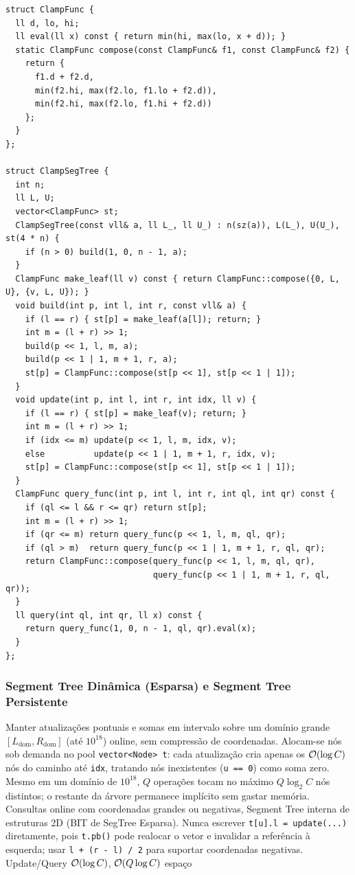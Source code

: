 \begin{lstlisting}
struct ClampFunc {
  ll d, lo, hi;
  ll eval(ll x) const { return min(hi, max(lo, x + d)); }
  static ClampFunc compose(const ClampFunc& f1, const ClampFunc& f2) {
    return {
      f1.d + f2.d,
      min(f2.hi, max(f2.lo, f1.lo + f2.d)),
      min(f2.hi, max(f2.lo, f1.hi + f2.d))
    };
  }
};

struct ClampSegTree {
  int n;
  ll L, U;
  vector<ClampFunc> st;
  ClampSegTree(const vll& a, ll L_, ll U_) : n(sz(a)), L(L_), U(U_), st(4 * n) {
    if (n > 0) build(1, 0, n - 1, a);
  }
  ClampFunc make_leaf(ll v) const { return ClampFunc::compose({0, L, U}, {v, L, U}); }
  void build(int p, int l, int r, const vll& a) {
    if (l == r) { st[p] = make_leaf(a[l]); return; }
    int m = (l + r) >> 1;
    build(p << 1, l, m, a);
    build(p << 1 | 1, m + 1, r, a);
    st[p] = ClampFunc::compose(st[p << 1], st[p << 1 | 1]);
  }
  void update(int p, int l, int r, int idx, ll v) {
    if (l == r) { st[p] = make_leaf(v); return; }
    int m = (l + r) >> 1;
    if (idx <= m) update(p << 1, l, m, idx, v);
    else          update(p << 1 | 1, m + 1, r, idx, v);
    st[p] = ClampFunc::compose(st[p << 1], st[p << 1 | 1]);
  }
  ClampFunc query_func(int p, int l, int r, int ql, int qr) const {
    if (ql <= l && r <= qr) return st[p];
    int m = (l + r) >> 1;
    if (qr <= m) return query_func(p << 1, l, m, ql, qr);
    if (ql > m)  return query_func(p << 1 | 1, m + 1, r, ql, qr);
    return ClampFunc::compose(query_func(p << 1, l, m, ql, qr),
                              query_func(p << 1 | 1, m + 1, r, ql, qr));
  }
  ll query(int ql, int qr, ll x) const {
    return query_func(1, 0, n - 1, ql, qr).eval(x);
  }
};
\end{lstlisting}

\subsubsection{Segment Tree Dinâmica (Esparsa) e Segment Tree Persistente}
\algobox
  {Manter atualizações pontuais e somas em intervalo sobre um domínio grande $[L_{\text{dom}}, R_{\text{dom}}]$ (até $10^{18}$) online, sem compressão de coordenadas.}
  {Alocam-se nós sob demanda no pool \texttt{vector<Node> t}: cada atualização cria apenas os $\mathcal{O}(\log C)$ nós do caminho até \texttt{idx}, tratando nós inexistentes (\texttt{u == 0}) como soma zero.}
  {Mesmo em um domínio de $10^{18}$, $Q$ operações tocam no máximo $Q \log_2 C$ nós distintos; o restante da árvore permanece implícito sem gastar memória.}
  {Consultas online com coordenadas grandes ou negativas, Segment Tree interna de estruturas 2D (BIT de SegTree Esparsa).}
  {Nunca escrever \texttt{t[u].l = update(...)} diretamente, pois \texttt{t.pb()} pode realocar o vetor e invalidar a referência à esquerda; usar \texttt{l + (r - l) / 2} para suportar coordenadas negativas.}
  {Update/Query $\mathcal{O}(\log C)$, $\mathcal{O}(Q \log C)$ espaço}

